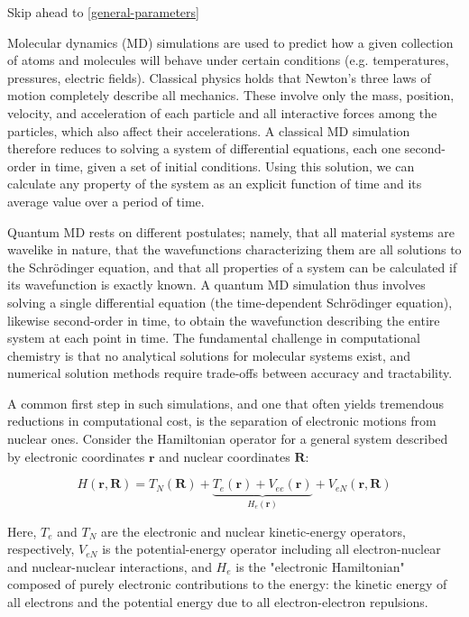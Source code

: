 \documentclass[12pt,letter,footinclude=true,headinclude=true,hyphens,oneside]{book} %
\begin{document}
    Skip ahead to \ref{general-parameters}
    
    Molecular dynamics (MD) simulations are used to predict how a given collection of atoms and molecules will behave under certain conditions (e.g. temperatures, pressures, electric fields). Classical physics holds that Newton's three laws of motion completely describe all mechanics. These involve only the mass, position, velocity, and acceleration of each particle and all interactive forces among the particles, which also affect their accelerations. A classical MD simulation therefore reduces to solving a system of differential equations, each one second-order in time, given a set of initial conditions. Using this solution, we can calculate any property of the system as an explicit function of time and its average value over a period of time.
    
    Quantum MD rests on different postulates; namely, that all material systems are wavelike in nature, that the wavefunctions characterizing them are all solutions to the Schr\"{o}dinger equation, and that all properties of a system can be calculated if its wavefunction is exactly known. A quantum MD simulation thus involves solving a single differential equation (the time-dependent Schr\"{o}dinger equation), likewise second-order in time, to obtain the wavefunction describing the entire system at each point in time. The fundamental challenge in computational chemistry is that no analytical solutions for molecular systems exist, and numerical solution methods require trade-offs between accuracy and tractability.
    
    A common first step in such simulations, and one that often yields tremendous reductions in computational cost, is the separation of electronic motions from nuclear ones. Consider the Hamiltonian operator for a general system described by electronic coordinates $\mathbf{r}$ and nuclear coordinates $\mathbf{R}$:
    
    \begin{equation}
    H(\mathbf{r}, \mathbf{R}) = T_N(\mathbf{R}) + \underbrace{T_e(\mathbf{r}) + V_{ee}(\mathbf{r})}_{H_e(\mathbf{r})} + V_{eN}(\mathbf{r}, \mathbf{R})
    \end{equation}
    
    Here, $T_e$ and $T_N$ are the electronic and nuclear kinetic-energy operators, respectively, $V_{eN}$ is the potential-energy operator including all electron-nuclear and nuclear-nuclear interactions, and $H_e$ is the "electronic Hamiltonian" composed of purely electronic contributions to the energy: the kinetic energy of all electrons and the potential energy due to all electron-electron repulsions.
    
\end{document}
